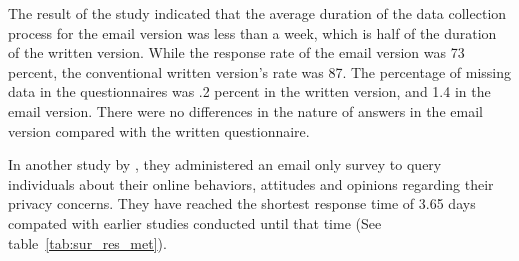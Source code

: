 The result of the study indicated that the average duration of the data collection process for the email version was less than a week, which is half of the duration of the written version. While the response rate of the email version was 73 percent, the conventional written version's rate was 87. The percentage of missing data in the questionnaires was .2 percent in the written version, and 1.4 in the email version. There were no differences in the nature of answers in the email version compared with the written questionnaire.
\vspace{1cm}

In another study by \cite{Sheehan2006}, they administered an email only survey to query individuals about their online behaviors, attitudes and opinions regarding their privacy concerns. They have reached the shortest response time of 3.65 days compated with earlier studies conducted until that time (See table~\ref{tab:sur_res_met}).

